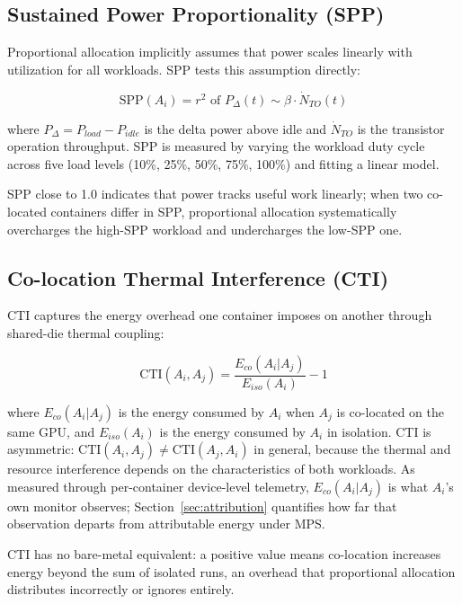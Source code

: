 \documentclass[conference]{IEEEtran}
\begin{document}
\subsection{Sustained Power Proportionality (SPP)}

Proportional allocation implicitly assumes that power scales linearly with utilization for all workloads. SPP tests this assumption directly:

\begin{equation}
\text{SPP}(A_i) = r^2 \text{ of } P_{\Delta}(t) \sim \beta \cdot \dot{N}_{TO}(t)
\label{eq:spp}
\end{equation}

where $P_{\Delta} = P_{load} - P_{idle}$ is the delta power above idle and $\dot{N}_{TO}$ is the transistor operation throughput. SPP is measured by varying the workload duty cycle across five load levels (10\%, 25\%, 50\%, 75\%, 100\%) and fitting a linear model.

SPP close to 1.0 indicates that power tracks useful work linearly; when two co-located containers differ in SPP, proportional allocation systematically overcharges the high-SPP workload and undercharges the low-SPP one.

\subsection{Co-location Thermal Interference (CTI)}

CTI captures the energy overhead one container imposes on another through shared-die thermal coupling:

\begin{equation}
\text{CTI}(A_i, A_j) = \frac{E_{co}(A_i | A_j)}{E_{iso}(A_i)} - 1
\label{eq:cti}
\end{equation}

where $E_{co}(A_i | A_j)$ is the energy consumed by $A_i$ when $A_j$ is co-located on the same GPU, and $E_{iso}(A_i)$ is the energy consumed by $A_i$ in isolation. CTI is asymmetric: $\text{CTI}(A_i, A_j) \neq \text{CTI}(A_j, A_i)$ in general, because the thermal and resource interference depends on the characteristics of both workloads. As measured through per-container device-level telemetry, $E_{co}(A_i | A_j)$ is what $A_i$'s own monitor observes; Section~\ref{sec:attribution} quantifies how far that observation departs from attributable energy under MPS.

CTI has no bare-metal equivalent: a positive value means co-location increases energy beyond the sum of isolated runs, an overhead that proportional allocation distributes incorrectly or ignores entirely.
\end{document}
